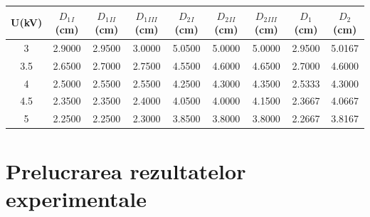 \documentclass{article}
\begin{document}
\begin{table}[H]
    \begin{tabular}{|c|c|c|c|c|c|c|c|c|}
    \hline
    {\color[HTML]{000000} U(kV)} & {\color[HTML]{000000} ${D}{_{1}{_I}}$(cm)} & {\color[HTML]{000000} ${D}{_{1}{_{II}}}$(cm)} & {\color[HTML]{000000} ${D}{_{1}{_{III}}}$(cm)} & {\color[HTML]{000000} ${D}{_{2}{_I}}$(cm)} & {\color[HTML]{000000} ${D}{_{2}{_{II}}}$(cm)} & {\color[HTML]{000000} ${D}{_{2}{_{III}}}$(cm)} & {\color[HTML]{000000} ${D}{_1}$(cm)} & {\color[HTML]{000000} ${D}{_2}$(cm)} \\ \hline
    {\color[HTML]{000000} 3}     & {\color[HTML]{000000} 2.9000}  & {\color[HTML]{000000} 2.9500}   & {\color[HTML]{000000} 3.0000}    & {\color[HTML]{000000} 5.0500}  & {\color[HTML]{000000} 5.0000}   & {\color[HTML]{000000} 5.0000}    & {\color[HTML]{000000} 2.9500} & {\color[HTML]{000000} 5.0167} \\ \hline
    {\color[HTML]{000000} 3.5}   & {\color[HTML]{000000} 2.6500}  & {\color[HTML]{000000} 2.7000}   & {\color[HTML]{000000} 2.7500}    & {\color[HTML]{000000} 4.5500}  & {\color[HTML]{000000} 4.6000}   & {\color[HTML]{000000} 4.6500}    & {\color[HTML]{000000} 2.7000} & {\color[HTML]{000000} 4.6000} \\ \hline
    {\color[HTML]{000000} 4}     & {\color[HTML]{000000} 2.5000}  & {\color[HTML]{000000} 2.5500}   & {\color[HTML]{000000} 2.5500}    & {\color[HTML]{000000} 4.2500}  & {\color[HTML]{000000} 4.3000}   & {\color[HTML]{000000} 4.3500}    & {\color[HTML]{000000} 2.5333} & {\color[HTML]{000000} 4.3000} \\ \hline
    {\color[HTML]{000000} 4.5}   & {\color[HTML]{000000} 2.3500}  & {\color[HTML]{000000} 2.3500}   & {\color[HTML]{000000} 2.4000}    & {\color[HTML]{000000} 4.0500}  & {\color[HTML]{000000} 4.0000}   & {\color[HTML]{000000} 4.1500}    & {\color[HTML]{000000} 2.3667} & {\color[HTML]{000000} 4.0667} \\ \hline
    {\color[HTML]{000000} 5}     & {\color[HTML]{000000} 2.2500}  & {\color[HTML]{000000} 2.2500}   & {\color[HTML]{000000} 2.3000}    & {\color[HTML]{000000} 3.8500}  & {\color[HTML]{000000} 3.8000}   & {\color[HTML]{000000} 3.8000}    & {\color[HTML]{000000} 2.2667} & {\color[HTML]{000000} 3.8167} \\ \hline
    \end{tabular}
    \end{table}

\section        {Prelucrarea rezultatelor experimentale}
\end{document}
